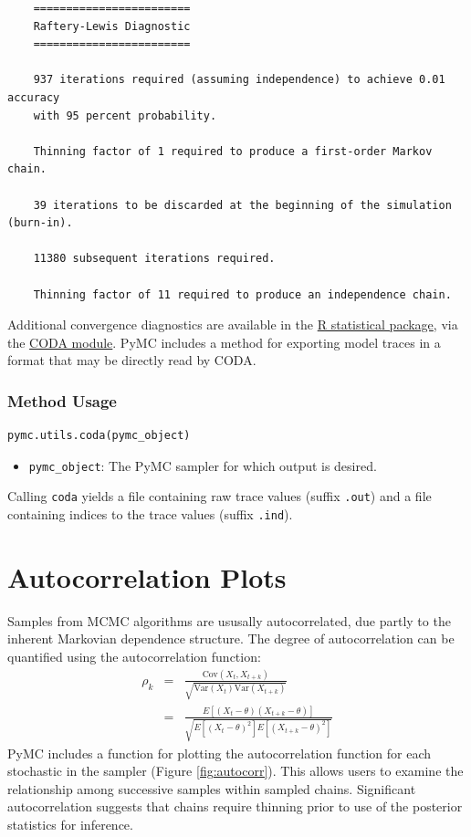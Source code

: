 \begin{verbatim}
	========================
	Raftery-Lewis Diagnostic
	========================

	937 iterations required (assuming independence) to achieve 0.01 accuracy
	with 95 percent probability.

	Thinning factor of 1 required to produce a first-order Markov chain.

	39 iterations to be discarded at the beginning of the simulation (burn-in).

	11380 subsequent iterations required.

	Thinning factor of 11 required to produce an independence chain.
\end{verbatim}

Additional convergence diagnostics are available in the
\href{http://lib.stat.cmu.edu/R/CRAN/}{R statistical package}, via the
\href{http://www-fis.iarc.fr/coda/}{CODA module}. PyMC includes a method
 for exporting model traces in a format that may be
directly read by CODA.

\subsubsection*{Method Usage}
\begin{verbatim}
pymc.utils.coda(pymc_object)
\end{verbatim}
\begin{itemize}

\item \verb=pymc_object=: The PyMC sampler for which output is desired.

\end{itemize}
Calling \verb=coda= yields a file containing raw trace values (suffix
\verb=.out=) and a file containing indices to the trace values (suffix
\verb=.ind=).


\hypertarget{autocorrelation}{}
\section{Autocorrelation Plots} %

Samples from MCMC algorithms are ususally autocorrelated, due partly to the
inherent Markovian dependence structure. The degree of autocorrelation can
be quantified using the autocorrelation function:
\begin{eqnarray*}
    \rho_k &=& \frac{\mbox{Cov}(X_t,
X_{t+k})}{\sqrt{\mbox{Var}(X_t)\mbox{Var}(X_{t+k})}} \\
            &=& \frac{E[(X_t - \theta)(X_{t+k} - \theta)]}{\sqrt{E[(X_t -
\theta)^2] E[(X_{t+k} - \theta)^2]}}
\end{eqnarray*}
PyMC includes a function for plotting the autocorrelation function for each
stochastic in the sampler (Figure \ref{fig:autocorr}). This allows users
to examine the relationship among successive samples within sampled chains.
Significant autocorrelation suggests that chains require thinning prior to
use of the posterior statistics for inference.

